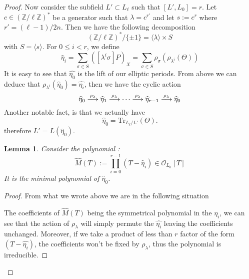 \documentclass[12pt]{article}
\theoremstyle{plain}
\newtheorem{lemma}[theorem]{Lemma}
\theoremstyle{definition}
\def\Z{\ensuremath{\mathbb{Z}}}
\begin{document}
\begin{proof}
Now consider the subfield $L'\subset L_\ell$ such that $[L', L_0] = r$. Let 
$c\in(\Z/\ell\Z)^{\ast}$ be a generator such that $\lambda=c^{r'}$ and let $s:=c^r$ 
where $r' = (\ell-1)/2n$. Then we have the following decomposition
\[
(\Z/\ell\Z)^{\ast}/\lbrace{\pm1}\rbrace = \langle{\lambda}\rangle \times S
\]
with $S = \langle{s}\rangle$. For $0 \leq i < r$, we define 
\begin{equation}
\widehat{\eta}_i = \sum_{\sigma\in S}{\left([\lambda^i\sigma]P\right)_X} =
\sum_{\sigma\in S}{\rho_{\sigma}(\rho_{\lambda^i}(\Theta))}
\end{equation}
It is easy to see that $\widehat{\eta_0}$ is the lift of our elliptic periods.
From above we can deduce that $\rho_{\lambda^i}(\widehat{\eta}_0) = 
\widehat{\eta_i}$, then we have the cyclic action
\begin{equation}
\widehat{\eta}_0 \buildrel\rho_\lambda\over\longrightarrow
\widehat{\eta}_1 \buildrel\rho_\lambda\over\longrightarrow \dots 
\buildrel\rho_\lambda\over\longrightarrow \widehat{\eta}_{r-1}
\buildrel\rho_\lambda\over\longrightarrow \widehat{\eta}_0
\end{equation}
Another notable fact, is that we actually have
\begin{equation}
\widehat{\eta}_0=\text{Tr}_{L_\ell/L'}(\Theta).
\end{equation}
therefore $L' = L(\widehat{\eta}_0)$.

\begin{lemma}
Consider the polynomial :
\begin{equation}
\widehat{M}(T):=\prod_{i=0}^{r-1}{(T-\widehat{\eta}_i)}\in\mathcal{O}_{L_0}[T]
\end{equation}
It is the minimal polynomial of $\widehat{\eta}_0$.
\end{lemma}

\begin{proof}
From what we wrote above we are in the following situation
\begin{center}
\end{center}
The coefficients of $\widehat{M}(T)$ being the symmetrical polynomial in the $\eta_i$, we
can see that the action of $\rho_\lambda$ will simply permute the $\widehat{\eta_i}$
leaving the coefficients unchanged. Moreover, if we take a product of less than
$r$ factor of the form $(T - \widehat{\eta_i})$, the coefficients won't be fixed
by $\rho_\lambda$, thus the polynomial is irreducible.


\end{proof}
\end{proof}
\end{document}
